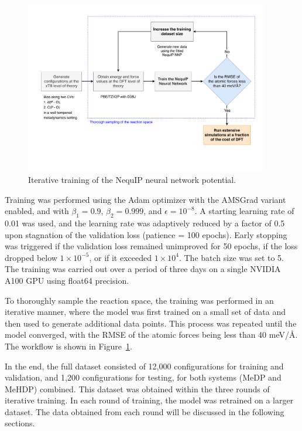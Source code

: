 \begin{figure}[t!]
    \centering
    \includegraphics[width=0.95\textwidth]{Figures/3_Computational_details/methods_workflow_diagram.pdf}
    \caption{Iterative training of the NequIP neural network potential.}
    \label{fig:iterative-training}
\end{figure}

Training was performed using the Adam optimizer with the AMSGrad variant enabled, and with $\beta_1 = 0.9$, $\beta_2 = 0.999$, and $\epsilon = 10^{-8}$. A starting learning rate of 0.01 was used, and the learning rate was adaptively reduced by a factor of 0.5 upon stagnation of the validation loss (patience = 100 epochs). Early stopping was triggered if the validation loss remained unimproved for 50 epochs, if the loss dropped below $1 \times 10^{-5}$, or if it exceeded $1 \times 10^{4}$. The batch size was set to 5. The training was carried out over a period of three days on a single NVIDIA A100 GPU using float64 precision.

To thoroughly sample the reaction space, the training was performed in an iterative manner, where the model was first trained on a small set of data and then used to generate additional data points. This process was repeated until the model converged, with the RMSE of the atomic forces being less than 40 meV/\AA. The workflow is shown in Figure~\ref{fig:iterative-training}.

In the end, the full dataset consisted of 12,000 configurations for training and validation, and 1,200 configurations for testing, for both systems (MeDP and MeHDP) combined. This dataset was obtained within the three rounds of iterative training. In each round of training, the model was retrained on a larger dataset. The data obtained from each round will be discussed in the following sections.




